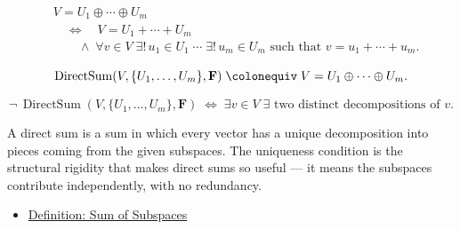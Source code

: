 \begin{remark*}
\[
\begin{aligned}
&V=U_1\oplus\cdots\oplus U_m \\
&\quad\Longleftrightarrow\quad
V=U_1+\cdots+U_m \\
&\qquad\land\;
\forall v \in V\;
\exists!\, u_1 \in U_1 \;\cdots\; \exists!\, u_m \in U_m
\text{ such that } v=u_1+\cdots+u_m.
\end{aligned}
\]
\end{remark*}

\begin{remark*}
\[
\operatorname{DirectSum}(V,\{U_1,\dots,U_m\},\mathbf{F})
\;\colonequiv\;
V=U_1\oplus\cdots\oplus U_m.
\]
\end{remark*}

\begin{remark*}
\[
\neg\,\operatorname{DirectSum}(V,\{U_1,\dots,U_m\},\mathbf{F})
\;\Longleftrightarrow\;
\exists v \in V\;\exists \text{ two distinct decompositions of } v.
\]
\end{remark*}

\begin{remark*}[Interpretation]
A direct sum is a sum in which every vector has a unique decomposition
into pieces coming from the given subspaces. The uniqueness condition is
the structural rigidity that makes direct sums so useful — it means the
subspaces contribute independently, with no redundancy.
\end{remark*}

\begin{remark*}[Dependencies]
\begin{itemize}
  \item \hyperref[def:sum-of-subspaces]{Definition: Sum of Subspaces}
\end{itemize}
\end{remark*}






